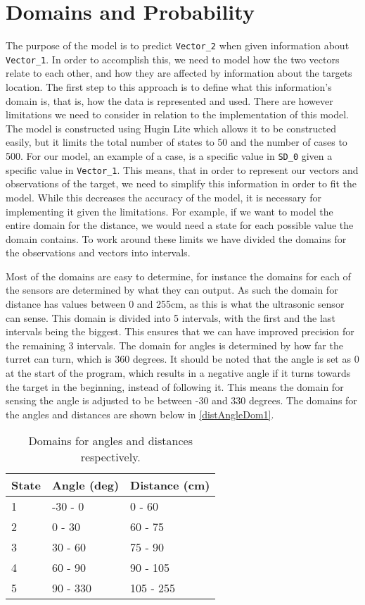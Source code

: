\section{Domains and Probability}\label{MID}
The purpose of the model is to predict \texttt{Vector\_2} when given information
about \texttt{Vector\_1}. In order to accomplish this, we need to model how the
two vectors relate to each other, and how they are affected by information about the
targets location. The first step to this approach is to define what this
information's domain is, that is, how the data is represented and used.
There are however limitations we need to consider in relation to the
implementation of this model. The model is constructed using Hugin Lite
\citep{Hugin} which allows it to be constructed easily, but it limits the total
number of states to 50 and the number of cases to 500. For our model, an example
of a case, is a specific value in \texttt{SD\_0} given a specific value in
\texttt{Vector\_1}. This means, that in order to represent our vectors and
observations of the target, we need to simplify this information in order to
fit the model. While this decreases the accuracy of the model, it is necessary
for implementing it given the limitations. For example, if we want to model the
entire domain for the distance, we would need a state for each possible value
the domain contains. To work around these limits we have divided the domains
for the observations and vectors into intervals.\nl

Most of the domains are easy to determine, for instance the domains for each of
the sensors are determined by what they can output. As such the domain for
distance has values between 0 and 255cm, as this is what the ultrasonic sensor
can sense. This domain is divided into 5 intervals, with the first and the last
intervals being the biggest. This ensures that we can have improved precision
for the remaining 3 intervals. The domain for angles is determined by how far
the turret can turn, which is 360 degrees. It should be noted that the angle is set
as 0 at the start of the program, which results in a negative angle if it turns
towards the target in the beginning, instead of following it. This means the
domain for sensing the angle is adjusted to be between -30 and 330 degrees. The
domains for the angles and distances are shown below in \autoref{distAngleDom1}. 

\begin{table}[H]
\centering
\begin{tabular}{l|l|l}
State & Angle (deg) & Distance (cm) \\ \hline
1     & -30 - 0     & 0 - 60        \\
2     & 0 - 30      & 60 - 75       \\
3     & 30 - 60     & 75 - 90       \\
4     & 60 - 90     & 90 - 105      \\
5     & 90 - 330    & 105 - 255     
\end{tabular}
\caption{Domains for angles and distances respectively.}
\label{distAngleDom1}
\end{table}

